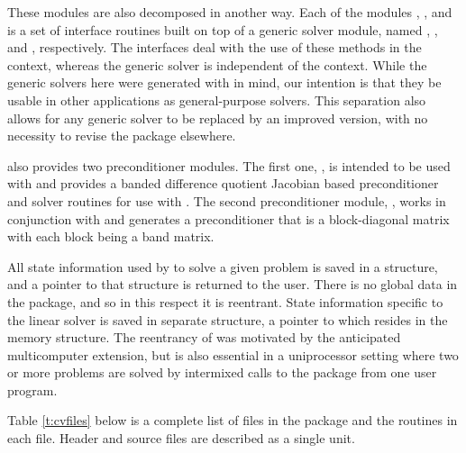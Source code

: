 These modules are also decomposed in another way.
Each of the modules {\cvdense}, {\cvband}, and {\cvspgmr} is a set of 
interface routines built on top of a generic solver module, 
named {\dense}, {\band}, and {\spgmr}, respectively.  
The interfaces deal with the use of these methods in the {\cvodes} context, 
whereas the generic solver is independent of the context.
While the generic solvers here were generated with {\sundials} in mind, our
intention is that they be usable in other applications as
general-purpose solvers.  This separation also allows for any generic
solver to be replaced by an improved version, with no necessity to
revise the {\cvode} package elsewhere.

{\cvode} also provides two preconditioner modules. The first one, 
{\cvbandpre}, is intended to be used with {\nvecs} and provides
a banded difference quotient Jacobian based preconditioner and solver
routines for use with {\cvspgmr}. The second preconditioner module, 
{\cvbbdpre}, works in conjunction with {\nvecp} and generates a 
preconditioner that is a block-diagonal matrix with each block being 
a band matrix.

All state information used by {\cvode} to solve a given problem is saved
in a structure, and a pointer to that structure is returned to the
user.  There is no global data in the {\cvode} package, and so in this
respect it is reentrant. State information specific to the linear
solver is saved in separate structure, a pointer to which resides in
the {\cvode} memory structure. The reentrancy of {\cvode} was motivated
by the anticipated multicomputer extension, but is also essential
in a uniprocessor setting where two or more problems are solved by
intermixed calls to the package from one user program.

Table \ref{t:cvfiles} below is a complete list of files in the {\cvode}
package and the routines in each file. 
Header and source files are described as a single unit.


